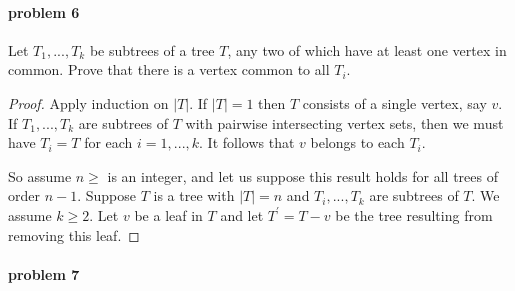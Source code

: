 \paragraph{problem 6}
Let $ T_1,...,T_k $ be subtrees of a tree $ T $, any two of which have at least 
one vertex in common. Prove that there is a vertex common to all $ T_i$.
\begin{proof}
   Apply induction on $ |T| $. If $ |T| = 1 $ then $ T $ consists of a single vertex,
   say $ v$. If $ T_1,...,T_k $ are subtrees of $ T $ with pairwise intersecting
   vertex sets, then we must have $ T_i = T $ for each $ i = 1,...,k$. It follows 
   that $ v $ belongs to each $ T_i$.
   
   \smallskip \noindent
   So assume $ n \geq $ is an integer, and let us suppose this result holds for 
   all trees of order $ n - 1 $. Suppose $ T $ is a tree with $ |T| = n $ and 
   $ T_i,...,T_k $ are subtrees of $ T $. We assume $ k \geq 2 $. Let $ v $ be a 
   leaf in $ T $ and let $ T^\prime = T - v $ be the tree resulting from removing
   this leaf. 
\end{proof}

\paragraph{problem 7}